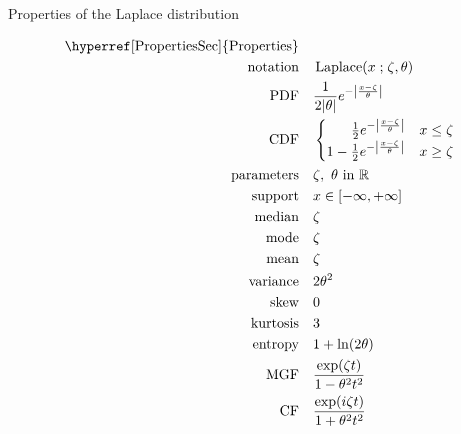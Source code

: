

\begin{table*}[t!]
\caption[Laplace distribution -- Properties]{Properties of the Laplace distribution}
\begin{align*}
\text{\hyperref[PropertiesSec]{Properties}}  \quad& \\
\text{notation}\quad & \op{Laplace}(x\given \pLoc, \theta) 				\checked
\\ 
\text{PDF} \quad & \frac{1}{2 |\theta|} e^{- \left|\frac{x-\pLoc}{\theta}\right|} 	\checked
\\
\text{CDF} \quad & 
\begin{cases}
\phantom{\tfrac{1}{2} -\ } \frac{1}{2} e^{ - \left|\frac{x-\pLoc}{\theta}\right| } & x\leq \pLoc  \checked
\\
1 - \tfrac{1}{2} e^{ - \left|\frac{x-\pLoc}{\theta}\right| } & x\geq \pLoc 			\checked
\end{cases}
\\
\text{parameters}\quad & \pLoc,\ \theta \text{ in } \mathbb{R}				\checked
\\
\text{support} \quad & x \in [ -\infty, +\infty] 							\checked
\\
\text{median} \quad & \pLoc                            							\checked
\\
\text{mode} \quad & \pLoc 										\checked
\\
\text{mean} \quad & \pLoc  										\checked
\\
\text{variance} \quad & 2\theta^2 									\checked
\\
\text{skew} \quad & 0 											\checked
\\ 
\text{kurtosis} \quad & 3 											\checked
\\ 
\text{entropy} \quad & 1+ \ln( 2 \theta) 								\checked
\\ 
\text{MGF} \quad &  \frac{\exp(\pLoc t) }{1- \theta^2 t^2}					\checked
\\
\text{CF} \quad & \frac{\exp(i\pLoc t) }{1+ \theta^2 t^2}					\checked
\end{align*}
\end{table*}